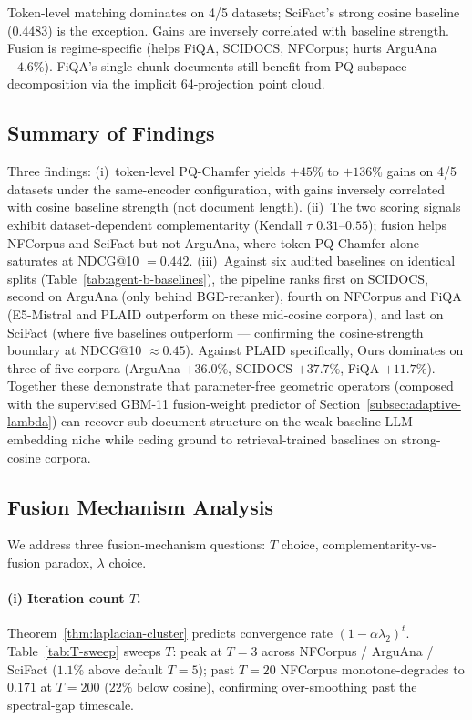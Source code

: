 \documentclass[review,1p]{elsarticle}
\begin{document}
Token-level matching dominates on 4/5 datasets; SciFact's strong cosine baseline ($0.4483$) is the exception. Gains are inversely correlated with baseline strength. Fusion is regime-specific (helps FiQA, SCIDOCS, NFCorpus; hurts ArguAna $-4.6\%$). FiQA's single-chunk documents still benefit from PQ subspace decomposition via the implicit 64-projection point cloud.

\subsection{Summary of Findings}
\label{subsec:key-findings}

Three findings: (i)~token-level PQ-Chamfer yields $+45\%$ to $+136\%$ gains on 4/5 datasets under the same-encoder configuration, with gains inversely correlated with cosine baseline strength (not document length). (ii)~The two scoring signals exhibit dataset-dependent complementarity (Kendall $\tau$ $0.31$--$0.55$); fusion helps NFCorpus and SciFact but not ArguAna, where token PQ-Chamfer alone saturates at NDCG@10 $=0.442$. (iii)~Against six audited baselines on identical splits (Table~\ref{tab:agent-b-baselines}), the pipeline ranks first on SCIDOCS, second on ArguAna (only behind BGE-reranker), fourth on NFCorpus and FiQA (E5-Mistral and PLAID outperform on these mid-cosine corpora), and last on SciFact (where five baselines outperform — confirming the cosine-strength boundary at NDCG@10 $\approx 0.45$). Against PLAID specifically, Ours dominates on three of five corpora (ArguAna $+36.0\%$, SCIDOCS $+37.7\%$, FiQA $+11.7\%$). Together these demonstrate that parameter-free geometric operators (composed with the supervised GBM-11 fusion-weight predictor of Section~\ref{subsec:adaptive-lambda}) can recover sub-document structure on the weak-baseline LLM embedding niche while ceding ground to retrieval-trained baselines on strong-cosine corpora.

\subsection{Fusion Mechanism Analysis}
\label{subsec:fusion-mechanism}

We address three fusion-mechanism questions: $T$ choice, complementarity-vs-fusion paradox, $\lambda$ choice.

\paragraph{(i) Iteration count $T$.} Theorem~\ref{thm:laplacian-cluster} predicts convergence rate $(1-\alpha\lambda_2)^t$. Table~\ref{tab:T-sweep} sweeps $T$: peak at $T=3$ across NFCorpus / ArguAna / SciFact ($1.1\%$ above default $T=5$); past $T=20$ NFCorpus monotone-degrades to $0.171$ at $T=200$ ($22\%$ below cosine), confirming over-smoothing past the spectral-gap timescale.
\end{document}
